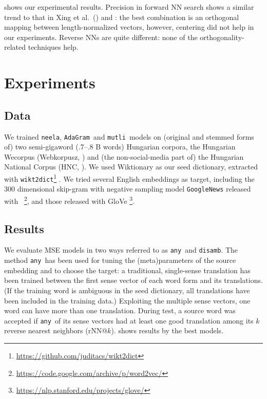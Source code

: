 \documentclass[11pt]{article}
\newcommand{\neelakantan}{\texttt{neela}}
\newcommand{\adagram}{\texttt{AdaGram}}
\newcommand{\mutli}{\texttt{mutli}}
\newcommand{\any}{\texttt{any}}
\newcommand{\disamb}{\texttt{disamb}}
\newcommand{\todo}[1]{}
\begin{document}
 shows our experimental results. Precision in forward NN
search shows a similar trend to that in Xing et al.~(\citeyear{Xing:2015}) and
\cite{Artetxe:2016}: the best combination is an orthogonal mapping between
length-normalized vectors, however, centering did not help in our experiments.
Reverse NNs are quite different: none of the orthogonality-related techniques
help.

\section{Experiments}
\label{sec:exper}

\subsection{Data}

We trained \neelakantan, \adagram~and \mutli~models on (original and stemmed
forms of) two semi-gigaword (.7--.8 B words) Hungarian corpora, the Hungarian
Wecorpus (Webkorpusz, \cite{Halacsy:2004}) and (the non-social-media part of)
the Hungarian National Corpus (HNC, \cite{Oravecz:2014}).  We used Wiktionary
as our seed dictionary, extracted with
\texttt{wikt2dict}\footnote{\url{https://github.com/juditacs/wikt2dict}}
\citep{Acs:2013}. We tried several English embeddings as target, including the
300 dimensional skip-gram with negative sampling model \texttt{GoogleNews}
released with
\wordtovec~\citep{Mikolov:2013f}\footnote{\url{https://code.google.com/archive/p/word2vec/}},
and those released with GloVe
\citep{Pennington:2014}\footnote{\url{https://nlp.stanford.edu/projects/glove/}}.

\subsection{Results}

\label{sec:res}


We evaluate MSE models in two ways referred to as \any~and \disamb.  The method
\any~has been used for tuning the (meta)parameters of the source embedding and
to choose the target: a traditional, single-sense translation has been trained
between the first \todo{all} sense vector of each word form and its
translations. (If the training word is ambiguous in the seed dictionary, all
translations have been included in the training data.)  Exploiting the multiple
sense vectors, one word can have more than one translation.  During test, a
source word was accepted if \any~\todo{the 1st}of its sense vectors had at
least one good translation among its $k$ reverse nearest neighbors (rNN@$k$).
 shows results by the best models.
\end{document}
